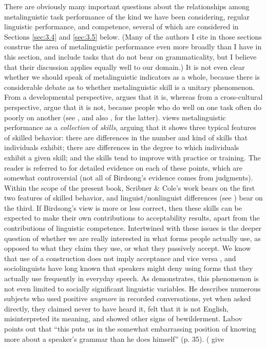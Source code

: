 There are obviously many important questions about the relationships among metalinguistic task performance of the kind we have been considering, regular linguistic performance, and competence, several of which are considered in Sections \ref{sec:3.4} and \ref{sec:3.5} below.
(Many of the authors I cite in those sections construe the area of metalinguistic performance even more broadly than I have in this section, and include tasks that do not bear on grammaticality, but I believe that their discussion applies equally well to our domain.) It is not even clear whether we should speak of metalinguistic indicators as a whole, because there is considerable debate as to whether metalinguistic skill is a unitary phenomenon. From a developmental perspective, \citet{Hakes1980} argues that it is, whereas from a cross-cultural perspective, \citet{ScribnerEtAl1981} argue that it is not, because people who do well on one task often do poorly on another (see , and also , for the latter). \citet{Birdsong1989} views metalinguistic performance as a \textit{collection} of \textit{skills}, arguing that it shows three typical features of skilled behavior: there are differences in the number and kind of skills that individuals exhibit; there are differences in the degree to which individuals exhibit a given skill; and the skills tend to improve with practice or training. The reader is referred to \citet[51\textendash{}54]{Birdsong1989} for detailed evidence on each of these points, which are somewhat controversial (not all of Birdsong's evidence comes from judgments). Within the scope of the present book, Scribner \& Cole's work bears on the first two features of skilled behavior, and linguist/nonlinguist differences (see ) bear on the third. If Birdsong's view is more or less correct, then these skills can be expected to make their own contributions to acceptability results, apart from the contributions of linguistic competence. Intertwined with these issues is the deeper question of whether we are really interested in what forms people actually use, as opposed to what they claim they use, or what they passively accept. We know that use of a construction does not imply acceptance and vice versa \citep{Greenbaum1976a}, and sociolinguists have long known that speakers might deny using forms that they actually use frequently in everyday speech. As \citet{Labov1975} demonstrates, this phenomenon is not even limited to socially significant linguistic variables. He describes numerous subjects who used positive \textit{anymore} in recorded conversations, yet when asked directly, they claimed never to have heard it, felt that it is not English, misinterpreted its meaning, and showed other signs of bewilderment. Labov points out that ``this puts us in the somewhat embarrassing position of knowing more about a speaker's grammar than he does himself'' (p. 35). (\citet{HindleEtAl1975} give 